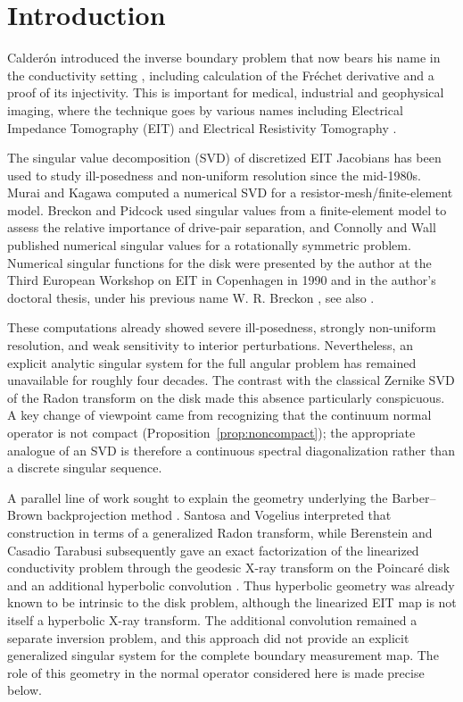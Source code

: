 \IfFileExists{iopjournal.cls}{\documentclass{iopjournal}}{\documentclass{iopjournal-draft}}
\theoremstyle{definition}
\theoremstyle{remark}
\numberwithin{equation}{section}
\begin{document}
\section{Introduction}

Calder\'on introduced the inverse boundary problem that now bears his name in the conductivity setting \cite{Calderon1980}, including calculation of the Fr\'echet derivative and a proof of its injectivity.  This is  important for medical, industrial and geophysical imaging, where the technique goes by various names including Electrical Impedance Tomography (EIT) and Electrical Resistivity Tomography  \cite{adler2015electrical}.


 
The singular value decomposition (SVD) of discretized EIT Jacobians has been used to study ill-posedness and non-uniform resolution since the mid-1980s.  Murai and Kagawa \cite{murai1985electrical} computed a numerical SVD for a resistor-mesh/finite-element model.  Breckon and Pidcock \cite{breckon1988some} used singular values from a finite-element model to assess the relative importance of drive-pair separation, and Connolly and Wall \cite{connolly1988inverse} published numerical singular values for a rotationally symmetric problem.  Numerical singular functions for the disk were presented by the author at the Third European Workshop on EIT in Copenhagen in 1990 and in the author's doctoral thesis, under his previous name  W. R. Breckon \cite{breckon1990image}, see also \cite{adler2021,Lionheart2026AtLast}.

These computations already showed severe ill-posedness, strongly non-uniform resolution, and weak sensitivity to interior perturbations.  Nevertheless, an explicit analytic singular system for the full angular problem has remained unavailable for roughly four decades.  The contrast with the classical Zernike SVD of the Radon transform on the disk made this absence particularly conspicuous.  A key change of viewpoint came from recognizing that the continuum normal operator is not compact (Proposition~\ref{prop:noncompact}); the appropriate analogue of an SVD is therefore a continuous spectral diagonalization rather than a discrete singular sequence.

A parallel line of work sought to explain the geometry underlying the
Barber--Brown backprojection method \cite{barber1986recent}.  Santosa and Vogelius interpreted
that construction in terms of a generalized Radon transform, while
Berenstein and Casadio Tarabusi subsequently gave an exact
factorization of the linearized conductivity problem through the
geodesic X-ray transform on the Poincar\'e disk and an additional
hyperbolic convolution
\cite{SantosaVogelius1990,
	BerensteinCasadio1994,
	BerensteinCasadio1996}.
Thus hyperbolic geometry was already known to be intrinsic to the disk
problem, although the linearized EIT map is not itself a hyperbolic
X-ray transform.  The additional convolution remained a separate
inversion problem, and this approach did not provide an explicit
generalized singular system for the complete boundary measurement map.
The role of this geometry in the
normal operator considered here is made precise below.
\end{document}
